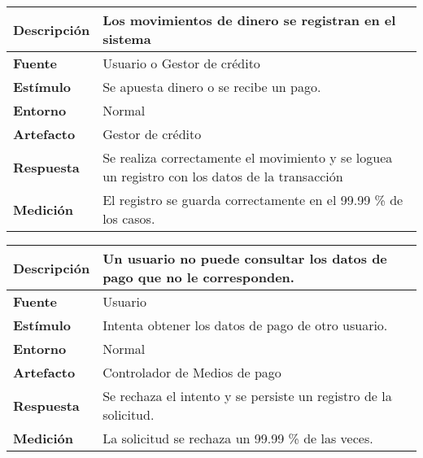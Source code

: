 \begin{center}
  \begin{tabular}{| l | p{10cm} | }
    \hline
	\textbf{Descripción} & Los movimientos de dinero se registran en el sistema\\  \hline
	\textbf{Fuente} & Usuario o Gestor de crédito\\  \hline
	\textbf{Estímulo} & Se apuesta dinero o se recibe un pago.\\  \hline
	\textbf{Entorno} & Normal\\  \hline
	\textbf{Artefacto} & Gestor de crédito\\  \hline
	\textbf{Respuesta} & Se realiza correctamente el movimiento y se loguea un registro con los datos de la transacción\\  \hline
	\textbf{Medición} & El registro se guarda correctamente en el 99.99 \% de los casos.\\  \hline
  \end{tabular}
\end{center}  

\begin{center}
  \begin{tabular}{| l | p{10cm} | }
    \hline
	\textbf{Descripción} & Un usuario no puede consultar los datos de pago que no le corresponden.\\  \hline
	\textbf{Fuente} & Usuario\\  \hline
	\textbf{Estímulo} & Intenta obtener los datos de pago de otro usuario.\\  \hline
	\textbf{Entorno} & Normal\\  \hline
	\textbf{Artefacto} & Controlador de Medios de pago\\  \hline
	\textbf{Respuesta} & Se rechaza el intento y se persiste un registro de la solicitud.\\  \hline
	\textbf{Medición} & La solicitud se rechaza un 99.99 \% de las veces.\\  \hline
  \end{tabular}
\end{center}

